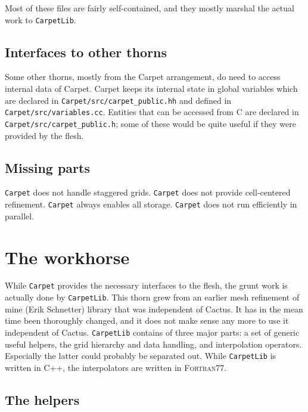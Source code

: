 \documentclass{article}
\begin{document}
   Most of these files are fairly self-contained, and they mostly
   marshal the actual work to \texttt{CarpetLib}.



\subsection{Interfaces to other thorns}

   Some other thorns, mostly from the Carpet arrangement, do need to
   access internal data of Carpet.  Carpet keeps its internal state in
   global variables which are declared in
   \texttt{Carpet/src/carpet\_public.hh} and defined in
   \texttt{Carpet/src/variables.cc}.  Entities that can be accessed
   from C are declared in \texttt{Carpet/src/carpet\_public.h}; some
   of these would be quite useful if they were provided by the flesh.



\subsection{Missing parts}

   \texttt{Carpet} does not handle staggered grids.  \texttt{Carpet}
   does not provide cell-centered refinement.  \texttt{Carpet} always
   enables all storage.  \texttt{Carpet} does not run efficiently in
   parallel.



\section{The workhorse}

   While \texttt{Carpet} provides the necessary interfaces to the
   flesh, the grunt work is actually done by \texttt{CarpetLib}.  This
   thorn grew from an earlier mesh refinement of mine (Erik Schnetter)
   library that was independent of Cactus.  It has in the mean time
   been thoroughly changed, and it does not make sense any more to use
   it independent of Cactus.  \texttt{CarpetLib} contains of three
   major parts: a set of generic useful helpers, the grid hierarchy
   and data handling, and interpolation operators.  Especially the
   latter could probably be separated out.  While \texttt{CarpetLib}
   is written in C++, the interpolators are written in
   \textsc{Fortran77}.



\subsection{The helpers}
\end{document}

